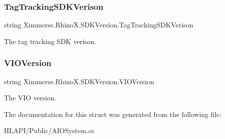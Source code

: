 \subsubsection{\texorpdfstring{Tag\+Tracking\+S\+D\+K\+Verison}{TagTrackingSDKVerison}}
{\footnotesize\ttfamily string Ximmerse.\+Rhino\+X.\+S\+D\+K\+Version.\+Tag\+Tracking\+S\+D\+K\+Verison}



The tag tracking S\+DK verison. 

\mbox{\label{struct_ximmerse_1_1_rhino_x_1_1_s_d_k_version_ae439edef76e7f763815d61ba8a167636}} 
\subsubsection{\texorpdfstring{V\+I\+O\+Version}{VIOVersion}}
{\footnotesize\ttfamily string Ximmerse.\+Rhino\+X.\+S\+D\+K\+Version.\+V\+I\+O\+Version}



The V\+IO version. 



The documentation for this struct was generated from the following file\+:\begin{DoxyCompactItemize}
\item 
H\+L\+A\+P\+I/\+Public/A\+I\+O\+System.\+cs\end{DoxyCompactItemize}
